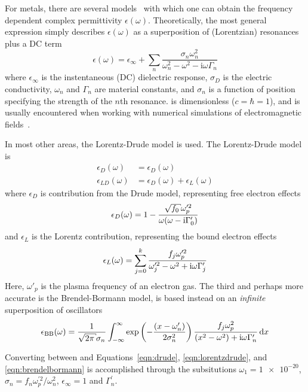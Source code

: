 For metals, there are several models~\cite{rakik1998optical} with which one
can obtain the frequency dependent complex permittivity $\epsilon(\omega)$.
Theoretically, the most general expression simply describes
$\epsilon(\omega)$ as a superposition of (Lorentzian) resonances plus a DC
term
\begin{equation}
\epsilon(\omega)= \epsilon_\infty+\sum_n \frac{\sigma_n \omega_n^2} {\omega_n^2-\omega^2-{\mathrm{i}}\omega\Gamma_n}
\label{eqn:meepdispersion}
\end{equation}
where $\epsilon_\infty$ is the instentaneous (DC) dielectric response,
$\sigma_D$ is the electric conductivity, $\omega_n$ and $\Gamma_n$ are
material constants, and $\sigma_n$ is a function of position specifying the
strength of the $n$th resonance.   is
dimensionless ($c=\hbar=1$), and is usually encountered when working with
numerical simulations of electromagnetic fields~\cite{oskooi2010meep}.

In most other areas, the Lorentz-Drude model is used.  The Lorentz-Drude model is 
\begin{align}
\epsilon_{D}(\omega)&=\epsilon_D(\omega)\\
\epsilon_{LD}(\omega)&=\epsilon_D(\omega)+\epsilon_L(\omega)
\end{align}
where $\epsilon_D$ is contribution from the Drude model, representing
free electron effects
\begin{align}
\epsilon_D(\omega)=1-\frac{\sqrt{f_0} \omega_p^{\prime 2}}{\omega(\omega -
\mi\Gamma_0^\prime)}
\label{eqn:drude}
\end{align}
and $\epsilon_L$ is the Lorentz contribution, representing the bound
electron effects
\begin{align}
\epsilon_L(\omega) =\sum_{j=0}^{k}\frac{f_j\omega_p^{\prime 2}}{\omega_j^{\prime
2}-\omega^2+{\mathrm{i}}\omega\Gamma_j^\prime}
\label{eqn:lorentzdrude}
\end{align}
Here, $\omega'_p$ is the plasma frequency of an electron gas.
The third and perhaps more accurate is the Brendel-Bormann model, is based instead on an
\textit{infinite} superposition of oscillators
\begin{align}
\epsilon_\text{BB}(\omega) = \frac{1}{\sqrt{2 \pi} \sigma_n} \intinfty
\exp\left(-\frac{(x-\omega'_n)}{2 \sigma_n^2}\right)
\frac{f_j \omega_p^2}{(x^2-\omega^2)+\mi \omega \Gamma'_n} \md x
\label{eqn:brendelbormann}
\end{align}

Converting between  and
Equations~\ref{eqn:drude}, \ref{eqn:lorentzdrude}, and
\ref{eqn:brendelbormann} is accomplished through the subsitutions $\omega_1
= \num{1e-20}$, $\sigma_n = {f_n \omega_p^{\prime 2}}/{\omega_n^2}$,
$\epsilon_\infty=1$ and $\Gamma_n^\prime$.
